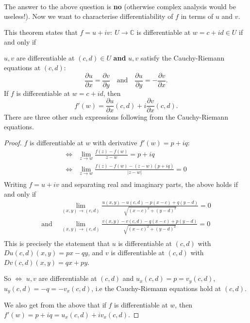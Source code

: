\documentclass[a4paper]{scrartcl}
\begin{document}
The answer to the above question is \textbf{no} (otherwise complex analysis would be useless!). Now we want to characterise differentiability of $f$ in terms of $u$ and $v$. 

\begin{theorem}
     This theorem states that $f=u+iv: \ U \rightarrow \mathbb{C}$ is differentiable at $w=c+id \in U$ if and only if 

     $u,v$ are differentiable at $(c,d) \in U$ \textbf{and} $u,v$ satisfy the Cauchy-Riemann equations at $(c,d)$: \[
     \frac{\partial u}{\partial x}=\frac{\partial v}{\partial y} \quad \text{and} \quad \frac{\partial u}{\partial y}=- \frac{\partial v}{\partial x}
     .\]  
     If $f$ is differentiable at $w=c+id$, then \[
     f' (w)= \frac{\partial u}{\partial x} (c,d)+i \frac{\partial v}{\partial x} (c,d)
     .\]  There are three other such expressions following from the Cauchy-Riemann equations. 
\end{theorem}
\begin{proof}
     $f$ is differentiable at $w$ with derivative $f' (w)=p+iq$:
     \begin{align*}
         \iff & \lim_{z \rightarrow w} \frac{f (z)- f (w)}{z-w}=p+iq\\
         \iff & \lim_{z \rightarrow w} \frac{f (z)- f (w)- (z-w)(p+iq)}{|z-w|}=0\\
     \end{align*}
     Writing $f=u+iv$ and separating real and imaginary parts, the above holds if and only if 
     \begin{align*}
        & \lim_{(x,y) \rightarrow (c,d)} \frac{u (x,y)- u (c,d)-p (x-c)+q (y-d)}{\sqrt{(x-c)^2+ (y-d)^2}}=0\\
        \text{and } & \lim_{(x,y) \rightarrow (c,d)} \frac{v (x,y)- v (c,d)-q (x-c)+p (y-d)}{\sqrt{(x-c)^2+ (y-d)^2}}=0\\
     \end{align*}
     This is precisely the statement that $u$ is differentiable at $(c,d)$ with $Du (c,d)(x,y)=px-qy$, and $v$ is differentiable at $(c,d)$ with $Dv (c,d)(x,y)=qx+py$. 

     So $\iff$ $u,v$ are differentiable at $(c,d)$ and $u_{x}(c,d)=p=v_{y}(c,d)$, $u_{y}(c,d)=-q=-v_{x}(c,d)$, i.e the Cauchy-Riemann equations hold at $(c,d)$. 

     We also get from the above that if $f$ is differentiable at $w$, then $f' (w)=p+iq=u_{x}(c,d)+iv_{x} (c,d)$.  
\end{proof}
\end{document}
